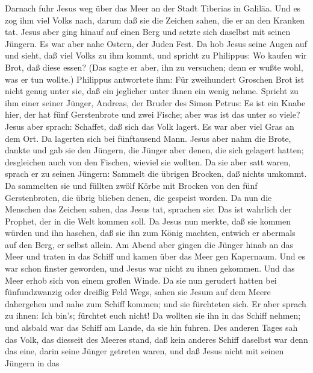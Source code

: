  Darnach fuhr Jesus weg über das Meer an der Stadt Tiberias
in Galiläa.  Und es zog ihm viel Volks nach, darum daß sie
die Zeichen sahen, die er an den Kranken tat.  Jesus aber
ging hinauf auf einen Berg und setzte sich daselbst mit seinen Jüngern.
 Es war aber nahe Ostern, der Juden Fest.  Da
hob Jesus seine Augen auf und sieht, daß viel Volks zu ihm kommt, und
spricht zu Philippus: Wo kaufen wir Brot, daß diese essen? 
(Das sagte er aber, ihn zu versuchen; denn er wußte wohl, was er tun
wollte.)  Philippus antwortete ihm: Für zweihundert Groschen
Brot ist nicht genug unter sie, daß ein jeglicher unter ihnen ein wenig
nehme.  Spricht zu ihm einer seiner Jünger, Andreas, der
Bruder des Simon Petrus:  Es ist ein Knabe hier, der hat
fünf Gerstenbrote und zwei Fische; aber was ist das unter so viele?
 Jesus aber sprach: Schaffet, daß sich das Volk lagert. Es
war aber viel Gras an dem Ort. Da lagerten sich bei fünftausend Mann.
 Jesus aber nahm die Brote, dankte und gab sie den Jüngern,
die Jünger aber denen, die sich gelagert hatten; desgleichen auch von
den Fischen, wieviel sie wollten.  Da sie aber satt waren,
sprach er zu seinen Jüngern: Sammelt die übrigen Brocken, daß nichts
umkommt.  Da sammelten sie und füllten zwölf Körbe mit
Brocken von den fünf Gerstenbroten, die übrig blieben denen, die
gespeist worden.  Da nun die Menschen das Zeichen sahen,
das Jesus tat, sprachen sie: Das ist wahrlich der Prophet, der in die
Welt kommen soll.  Da Jesus nun merkte, daß sie kommen
würden und ihn haschen, daß sie ihn zum König machten, entwich er
abermals auf den Berg, er selbst allein.  Am Abend aber
gingen die Jünger hinab an das Meer  und traten in das
Schiff und kamen über das Meer gen Kapernaum. Und es war schon finster
geworden, und Jesus war nicht zu ihnen gekommen.  Und das
Meer erhob sich von einem großen Winde.  Da sie nun
gerudert hatten bei fünfundzwanzig oder dreißig Feld Wegs, sahen sie
Jesum auf dem Meere dahergehen und nahe zum Schiff kommen; und sie
fürchteten sich.  Er aber sprach zu ihnen: Ich bin's;
fürchtet euch nicht!  Da wollten sie ihn in das Schiff
nehmen; und alsbald war das Schiff am Lande, da sie hin fuhren.
 Des anderen Tages sah das Volk, das diesseit des Meeres
stand, daß kein anderes Schiff daselbst war denn das eine, darin seine
Jünger getreten waren, und daß Jesus nicht mit seinen Jüngern in das
